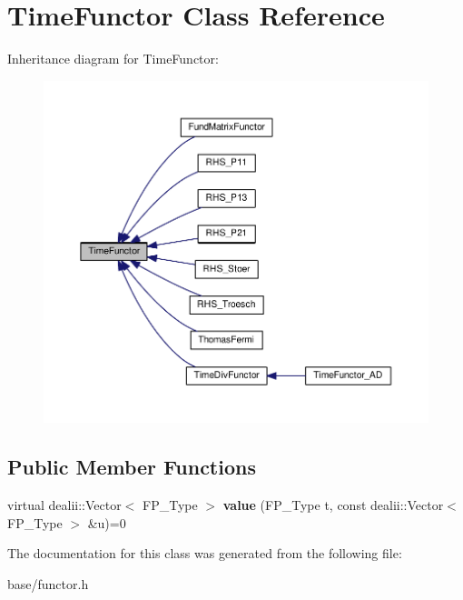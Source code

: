 \hypertarget{classTimeFunctor}{}\section{Time\+Functor Class Reference}
\label{classTimeFunctor}


Inheritance diagram for Time\+Functor\+:
\nopagebreak
\begin{figure}[H]
\begin{center}
\leavevmode
\includegraphics[width=350pt]{classTimeFunctor__inherit__graph}
\end{center}
\end{figure}
\subsection*{Public Member Functions}
\begin{DoxyCompactItemize}
\item 
\mbox{\label{classTimeFunctor_a342f53e76448d87fc5414964361acd6b}} 
virtual dealii\+::\+Vector$<$ F\+P\+\_\+\+Type $>$ {\bfseries value} (F\+P\+\_\+\+Type t, const dealii\+::\+Vector$<$ F\+P\+\_\+\+Type $>$ \&u)=0
\end{DoxyCompactItemize}


The documentation for this class was generated from the following file\+:\begin{DoxyCompactItemize}
\item 
base/functor.\+h\end{DoxyCompactItemize}
